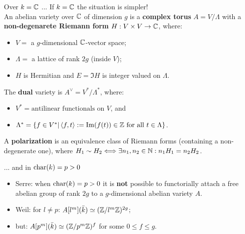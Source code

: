 \documentclass{beamer}
\begin{document}
\begin{frame}{Over $k=\mathbb{C}$ ...}
  If $k= \mathbb{C}$ the situation is simpler!\\
\pause
  An abelian variety over $\mathbb{C}$ of dimension $g$ is a \textbf{complex torus} $A=V/\Lambda$  with a \textbf{non-degenarete Riemann form} $H:V\times V \to \mathbb{C}$, where:
\pause
  \begin{itemize}
    \item $V = $ a $g$-dimensional $\mathbb{C}$-vector space;
    \item $\Lambda =$ a lattice of rank $2g$ (inside $V$);
    \item $H$ is Hermitian and $E=\Im H$ is integer valued on $\Lambda$.
  \end{itemize}
\pause
  The \textbf{dual} variety is $A^\vee = V^*/\Lambda^*$, where:
  \begin{itemize}
    \item $V^* = {\text{antilinear functionals on } V }$, and
    \item $\Lambda^* = \left\lbrace f\in V^* | \left<f,t\right>:=\operatorname{Im}(f(t)) \in \mathbb{Z} \text{ for all }t\in \Lambda\right\rbrace$.
  \end{itemize}
\pause
  A \textbf{polarization} is an equivalence class of Riemann forms (containing a non-degenerate one), where $H_1\sim H_2 \Longleftrightarrow \exists n_1,n_2\in \mathbb{N}: n_1H_1=n_2H_2$.
\end{frame}

\begin{frame}{... and in $\operatorname{char}(k)=p>0$}

  \begin{itemize}
    \pause \item Serre: when $\operatorname{char}(k)=p>0$ it is \textbf{not} possible to functorially attach a free abelian group of rank $2g$ to a $g$-dimensional abelian variety $A$.
    \pause \item Weil: for $l\neq p$: $A[l^m](\bar k)\simeq (\mathbb{Z}/l^m\mathbb{Z})^{2g}$;
    \pause \item but: $A[p^m](\bar k)\simeq (\mathbb{Z}/p^m\mathbb{Z})^{f}$ for some $0\leq f \leq g$.
  \end{itemize}
\end{frame}
\end{document}
